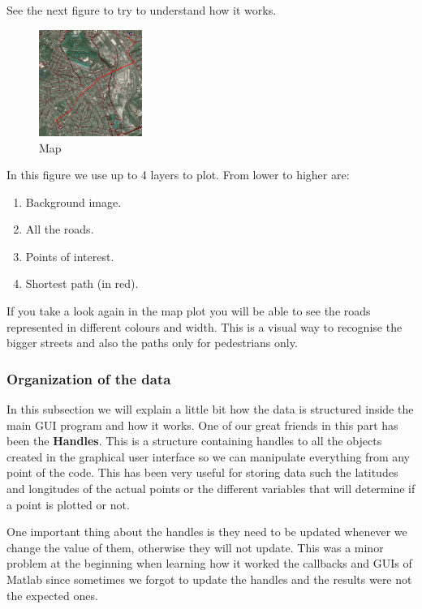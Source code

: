 \documentclass{article}
\begin{document}
See the next figure to try to understand how it works.

\begin{figure}[h]
\centering
\includegraphics[width=0.3\textwidth]{map_plot}
\caption{Map}
\label{fig:map_plot}
\end{figure}

In this figure we use up to 4 layers to plot. From lower to higher are:
\begin{enumerate}
\item
Background image.
\item
All the roads.
\item
Points of interest.
\item
Shortest path (in red).
\end{enumerate}

If you take a look again in the map plot you will be able to see the roads represented in different colours and width. This is a visual way to recognise the bigger streets and also the paths only for pedestrians only.

\subsubsection{Organization of the data}

In this subsection we will explain a little bit how the data is structured inside the main GUI program and how it works. One of our great friends in this part has been the \textbf{Handles}. This is a structure containing handles to all the objects created in the graphical user interface so we can manipulate everything from any point of the code. This has been very useful for storing data such the latitudes and longitudes of the actual points or the different variables that will determine if a point is plotted or not.

One important thing about the handles is they need to be updated whenever we change the value of them, otherwise they will not update. This was a minor problem at the beginning when learning how it worked the callbacks and GUIs of Matlab since sometimes we forgot to update the handles and the results were not the expected ones.
\end{document}
